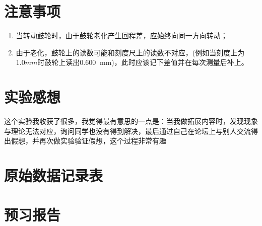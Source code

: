 \documentclass[11pt]{article}
\newcommand*{\unit}[1]{\mathop{}\!\mathrm{#1}}
\newcommand{\mm}{\unit{mm}}
\begin{document}
\section{注意事项}
\begin{enumerate}
	\item 当转动鼓轮时，由于鼓轮老化产生回程差，应始终向同一方向转动；
	\item 由于老化，鼓轮上的读数可能和刻度尺上的读数不对应，(例如当刻度上为\(1.0mm\)时鼓轮上读出\(0.600\mm\))，此时应该记下差值并在每次测量后补上。
\end{enumerate}

\section{实验感想}
这个实验我收获了很多，我觉得最有意思的一点是：当我做拓展内容时，发现现象与理论无法对应，询问同学也没有得到解决，最后通过自己在论坛上与别人交流得出假想，并再次做实验验证假想，这个过程非常有趣

\newpage
{}

\appendix

\section{原始数据记录表}



\section{预习报告}

\end{document}
